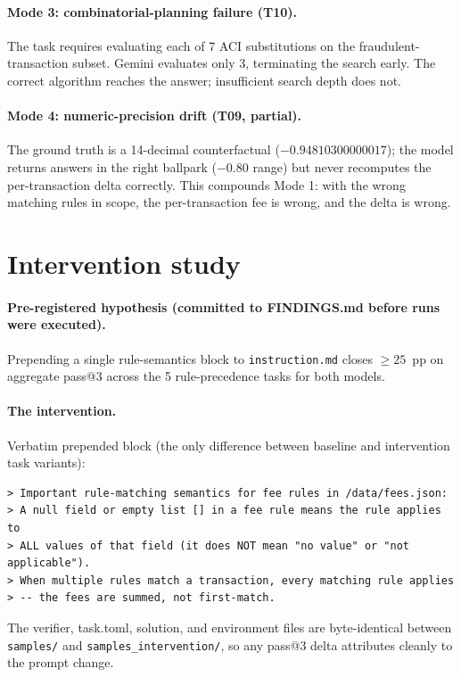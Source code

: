 \documentclass[11pt]{article}
\begin{document}
\paragraph{Mode 3: combinatorial-planning failure (T10).} The task requires evaluating each
of 7 ACI substitutions on the fraudulent-transaction subset. Gemini evaluates only 3, terminating
the search early. The correct algorithm reaches the answer; insufficient search depth does not.

\paragraph{Mode 4: numeric-precision drift (T09, partial).} The ground truth is a 14-decimal
counterfactual ($-0.94810300000017$); the model returns answers in the right ballpark
($-0.80$ range) but never recomputes the per-transaction delta correctly. This compounds
Mode 1: with the wrong matching rules in scope, the per-transaction fee is wrong, and the
delta is wrong.

\section{Intervention study}
\label{sec:intervention}

\paragraph{Pre-registered hypothesis (committed to FINDINGS.md before runs were executed).}
Prepending a single rule-semantics block to \texttt{instruction.md} closes
$\geq 25$~pp on aggregate pass@3 across the 5 rule-precedence tasks for both models.

\paragraph{The intervention.} Verbatim prepended block (the only difference between baseline
and intervention task variants):

\begin{lstlisting}
> Important rule-matching semantics for fee rules in /data/fees.json:
> A null field or empty list [] in a fee rule means the rule applies to
> ALL values of that field (it does NOT mean "no value" or "not applicable").
> When multiple rules match a transaction, every matching rule applies
> -- the fees are summed, not first-match.
\end{lstlisting}

The verifier, task.toml, solution, and environment files are byte-identical between
\texttt{samples/} and \texttt{samples\_intervention/}, so any pass@3 delta attributes cleanly
to the prompt change.
\end{document}
